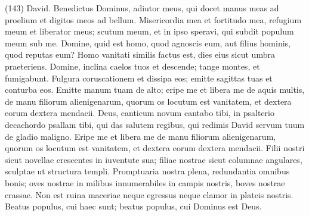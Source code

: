 \begin{biblechapter}  (143) 
\verse David. Benedictus Dominus, adiutor meus, qui docet manus meas ad proelium et digitos meos ad bellum. 
\verse Misericordia mea et fortitudo mea, refugium meum et liberator meus; scutum meum, et in ipso speravi, qui subdit populum meum sub me. 
\verse Domine, quid est homo, quod agnoscis eum, aut filius hominis, quod reputas eum? 
\verse Homo vanitati similis factus est, dies eius sicut umbra praeteriens. 
\verse Domine, inclina caelos tuos et descende; tange montes, et fumigabunt. 
\verse Fulgura coruscationem et dissipa eos; emitte sagittas tuas et conturba eos. 
\verse Emitte manum tuam de alto; eripe me et libera me de aquis multis, de manu filiorum alienigenarum, 
\verse quorum os locutum est vanitatem, et dextera eorum dextera mendacii. 
\verse Deus, canticum novum cantabo tibi, in psalterio decachordo psallam tibi, 
\verse qui das salutem regibus, qui redimis David servum tuum de gladio maligno. 
\verse Eripe me et libera me de manu filiorum alienigenarum, quorum os locutum est vanitatem, et dextera eorum dextera mendacii. 
\verse Filii nostri sicut novellae crescentes in iuventute sua; filiae nostrae sicut columnae angulares, sculptae ut structura templi. 
\verse Promptuaria nostra plena, redundantia omnibus bonis; oves nostrae in milibus innumerabiles in campis nostris, 
\verse boves nostrae crassae. Non est ruina maceriae neque egressus neque clamor in plateis nostris. 
\verse Beatus populus, cui haec sunt; beatus populus, cui Dominus est Deus. 
\end{biblechapter}

